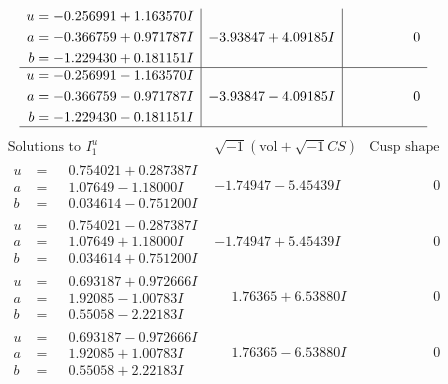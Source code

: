 \documentclass[1p]{elsarticle_modified}
\theoremstyle{definition}
\newcommand{\I}{\sqrt{-1}}
\begin{document}
$$\begin{array}{c|c|c}
\begin{aligned}
u &= -0.256991 + 1.163570 I \\
a &= -0.366759 + 0.971787 I \\
b &= -1.229430 + 0.181151 I\end{aligned}
 & -3.93847 + 4.09185 I & \phantom{-0.000000 } 0 \\ \hline\begin{aligned}
u &= -0.256991 - 1.163570 I \\
a &= -0.366759 - 0.971787 I \\
b &= -1.229430 - 0.181151 I\end{aligned}
 & -3.93847 - 4.09185 I & \phantom{-0.000000 } 0\\
 \hline 
 \end{array}$$\newpage$$\begin{array}{c|c|c}  
\text{Solutions to }I^u_{1}& \I (\text{vol} + \sqrt{-1}CS) & \text{Cusp shape}\\
 \hline 
\begin{aligned}
u &= \phantom{-}0.754021 + 0.287387 I \\
a &= \phantom{-}1.07649 - 1.18000 I \\
b &= \phantom{-}0.034614 - 0.751200 I\end{aligned}
 & -1.74947 - 5.45439 I & \phantom{-0.000000 } 0 \\ \hline\begin{aligned}
u &= \phantom{-}0.754021 - 0.287387 I \\
a &= \phantom{-}1.07649 + 1.18000 I \\
b &= \phantom{-}0.034614 + 0.751200 I\end{aligned}
 & -1.74947 + 5.45439 I & \phantom{-0.000000 } 0 \\ \hline\begin{aligned}
u &= \phantom{-}0.693187 + 0.972666 I \\
a &= \phantom{-}1.92085 - 1.00783 I \\
b &= \phantom{-}0.55058 - 2.22183 I\end{aligned}
 & \phantom{-}1.76365 + 6.53880 I & \phantom{-0.000000 } 0 \\ \hline\begin{aligned}
u &= \phantom{-}0.693187 - 0.972666 I \\
a &= \phantom{-}1.92085 + 1.00783 I \\
b &= \phantom{-}0.55058 + 2.22183 I\end{aligned}
 & \phantom{-}1.76365 - 6.53880 I & \phantom{-0.000000 } 0 \\ \hline\begin{aligned}

\end{aligned}
\end{array}$$
\end{document}
